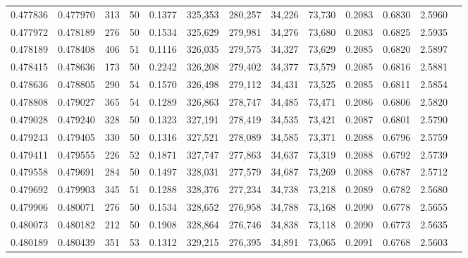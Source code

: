 \begin{tabular}{rrrrrrrrrrrrr}
0.477836 & 0.477970 &   313 &  50 &                                     0.1377 & 325,353 & 280,257 &  34,226 &  73,730 & 0.2083 & 0.6830 & 2.5960 \\
0.477972 & 0.478189 &   276 &  50 &                                     0.1534 & 325,629 & 279,981 &  34,276 &  73,680 & 0.2083 & 0.6825 & 2.5935 \\
0.478189 & 0.478408 &   406 &  51 &                                     0.1116 & 326,035 & 279,575 &  34,327 &  73,629 & 0.2085 & 0.6820 & 2.5897 \\
0.478415 & 0.478636 &   173 &  50 &                                     0.2242 & 326,208 & 279,402 &  34,377 &  73,579 & 0.2085 & 0.6816 & 2.5881 \\
0.478636 & 0.478805 &   290 &  54 &                                     0.1570 & 326,498 & 279,112 &  34,431 &  73,525 & 0.2085 & 0.6811 & 2.5854 \\
0.478808 & 0.479027 &   365 &  54 &                                     0.1289 & 326,863 & 278,747 &  34,485 &  73,471 & 0.2086 & 0.6806 & 2.5820 \\
0.479028 & 0.479240 &   328 &  50 &                                     0.1323 & 327,191 & 278,419 &  34,535 &  73,421 & 0.2087 & 0.6801 & 2.5790 \\
0.479243 & 0.479405 &   330 &  50 &                                     0.1316 & 327,521 & 278,089 &  34,585 &  73,371 & 0.2088 & 0.6796 & 2.5759 \\
0.479411 & 0.479555 &   226 &  52 &                                     0.1871 & 327,747 & 277,863 &  34,637 &  73,319 & 0.2088 & 0.6792 & 2.5739 \\
0.479558 & 0.479691 &   284 &  50 &                                     0.1497 & 328,031 & 277,579 &  34,687 &  73,269 & 0.2088 & 0.6787 & 2.5712 \\
0.479692 & 0.479903 &   345 &  51 &                                     0.1288 & 328,376 & 277,234 &  34,738 &  73,218 & 0.2089 & 0.6782 & 2.5680 \\
0.479906 & 0.480071 &   276 &  50 &                                     0.1534 & 328,652 & 276,958 &  34,788 &  73,168 & 0.2090 & 0.6778 & 2.5655 \\
0.480073 & 0.480182 &   212 &  50 &                                     0.1908 & 328,864 & 276,746 &  34,838 &  73,118 & 0.2090 & 0.6773 & 2.5635 \\
0.480189 & 0.480439 &   351 &  53 &                                     0.1312 & 329,215 & 276,395 &  34,891 &  73,065 & 0.2091 & 0.6768 & 2.5603 \\

\end{tabular}
